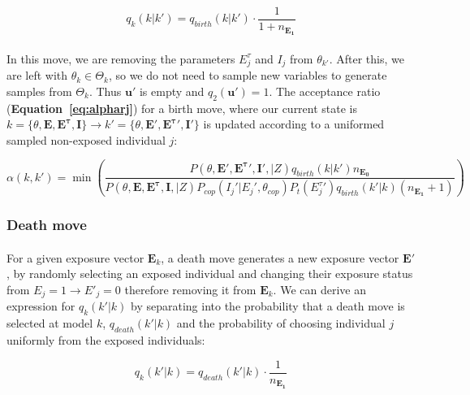 \begin{equation}
q_k(k | k') = q_{birth}(k |k')\cdot \frac{1}{1 + n_{\mathbf{E_1}}}
\end{equation}


\paragraph{}In this move, we are removing the parameters $E_j^\tau$ and $I_j$ from $\theta_{k'}$. After this, we are left with $\theta_k \in \Theta_k$, so we do not need to sample new variables to generate samples from $\Theta_k$. Thus $\mathbf{u}'$ is empty and  $q_2(\mathbf{u}') = 1$. The acceptance ratio (\textbf{Equation~\ref{eq:alpharj}}) for a birth move, where our current state is $k = \{\theta, \mathbf{E}, \mathbf{E^\tau}, \mathbf{I}\} \rightarrow k' = \{\theta, \mathbf{E}', \mathbf{E^\tau}', \mathbf{I}'\}$ is updated according to a uniformed sampled non-exposed individual $j$:

\begin{equation}
\label{acc:birth}
\alpha(k, k') = \min\left(\frac{P(\theta, \mathbf{E}', \mathbf{E^\tau}', \mathbf{I}', | Z)q_{birth}(k|k')n_{\mathbf{E_0}}}{P(\theta, \mathbf{E}, \mathbf{E^\tau}, \mathbf{I}, | Z)P_{cop}(I_{j}' | E_{j}', \theta_{cop})P_t(E^\tau_j')q_{birth}(k'|k)(n_{\mathbf{E_1}} + 1)} \right)
\end{equation}


\subsubsection{Death move}


\paragraph{}For a given exposure vector $\mathbf{E}_k$, a death move generates a new exposure vector $\mathbf{E'}$, by randomly selecting an exposed individual and changing their exposure status from $E_j = 1 \rightarrow E'_j = 0$ therefore removing it from $\mathbf{E}_k$. We can derive an expression for $q_k(k' | k)$ by separating into the probability that a death move is selected at model $k$, $q_{death}(k' |k)$ and the probability of choosing individual $j$ uniformly from the exposed individuals:

\begin{equation}
q_k(k' | k) = q_{death}(k' |k)\cdot \frac{1}{n_{\mathbf{E_1}}}
\end{equation}

